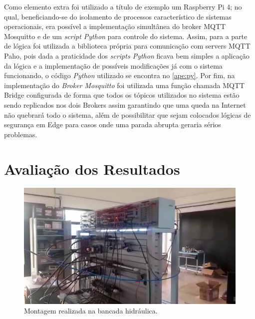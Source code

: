 Como elemento extra foi utilizado a título de exemplo um Raspberry Pi 4; no qual, beneficiando-se do isolamento de processos 
característico de sistemas operacionais, era possível a implementação simultânea do broker \ac{MQTT} Mosquitto e de um \textit{script 
Python} para controle do sistema. Assim, para a parte de lógica foi utilizada a biblioteca própria para comunicação com 
servers \ac{MQTT} Paho, pois dada a praticidade dos \textit{scripts Python} ficava bem simples a aplicação da lógica e a implementação 
de possíveis modificações já com o sistema funcionando, o código \textit{Python} utilizado se encontra no \autoref{ape:py}. Por fim, na implementação do \textit{Broker Mosquitto} foi utilizada uma 
função chamada \ac{MQTT} Bridge\cite{mosq-doc} configurada de forma que todos os tópicos utilizados no sistema estão sendo 
replicados nos dois Brokers assim garantindo que uma queda na Internet não quebrará todo o sistema, além de possibilitar
que sejam colocados lógicas de segurança em Edge para casos onde uma parada abrupta geraria sérios problemas.

\section{Avaliação dos Resultados}
\label{avaliacao}

\begin{figure}[htb]
    \begin{center}
        \includegraphics[scale=0.5]{figs/exp_h.png}
    \end{center}
    \caption{\label{fig:exp_m1} Montagem realizada na bancada hidráulica.} 
\end{figure}

